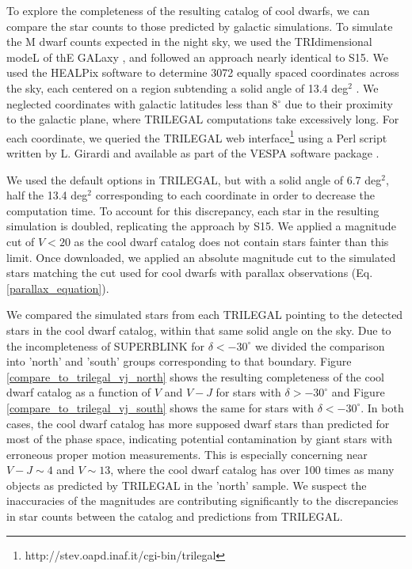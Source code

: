 \documentclass[twocolumn]{aastex62}
\begin{document}
To explore the completeness of the resulting catalog of cool dwarfs, we can compare the star counts to those predicted by galactic simulations.  To simulate the M dwarf counts expected in the night sky, we used the TRIdimensional modeL of thE GALaxy \citep[TRILEGAL, pronounced TREE-leh-GOW,][]{Girardi2005}, and followed an approach nearly identical to S15.  We used the HEALPix software to determine 3072 equally spaced coordinates across the sky, each centered on a region subtending a solid angle of 13.4 deg$^2$ \citep{Gorski2005}.  We neglected coordinates with galactic latitudes less than 8$^\circ$ due to their proximity to the galactic plane, where TRILEGAL computations take excessively long.  For each coordinate, we queried the TRILEGAL web interface\footnote{http://stev.oapd.inaf.it/cgi-bin/trilegal} using a Perl script written by L. Girardi and available as part of the VESPA software package \citep[][]{Morton2012, Morton2015}.


We used the default options in TRILEGAL, but with a solid angle of 6.7 deg$^2$, half the 13.4 deg$^2$ corresponding to each coordinate in order to decrease the computation time.  To account for this discrepancy, each star in the resulting simulation is doubled, replicating the approach by S15.  We applied a magnitude cut of $V<20$ as the cool dwarf catalog does not contain stars fainter than this limit.  Once downloaded, we applied an absolute magnitude cut to the simulated stars matching the cut used for cool dwarfs with parallax observations (Eq. \ref{parallax_equation}). 

We compared the simulated stars from each TRILEGAL pointing to the detected stars in the cool dwarf catalog, within that same solid angle on the sky.  Due to the incompleteness of SUPERBLINK for $\delta<-30^\circ$ we divided the comparison into 'north' and 'south' groups corresponding to that boundary.  Figure \ref{compare_to_trilegal_vj_north} shows the resulting completeness of the cool dwarf catalog as a function of $V$ and $V-J$ for stars with $\delta>-30^\circ$ and Figure \ref{compare_to_trilegal_vj_south} shows the same for stars with $\delta<-30^\circ$.  In both cases, the cool dwarf catalog has more supposed dwarf stars than predicted for most of the phase space, indicating potential contamination by giant stars with erroneous proper motion measurements.  This is especially concerning near $V-J\sim4$ and $V\sim13$, where the cool dwarf catalog has over 100 times as many objects as predicted by TRILEGAL in the 'north' sample.  We suspect the inaccuracies of the magnitudes are contributing significantly to the discrepancies in star counts between the catalog and predictions from TRILEGAL.
\end{document}
